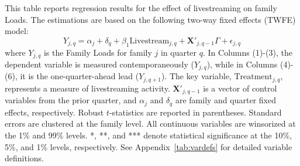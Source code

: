 \begin{table}[!ht]
    \centering
    
    \caption{Dynamic Livestream Effect on Family Loads}\label{tab:family_twfe_loads_reallocation}
    
    \begin{minipage}{0.95\textwidth}
        \footnotesize
        This table reports regression results for the effect of livestreaming on family Loads. The estimations are based on the following two-way fixed effects (TWFE) model:
        \begin{equation*}
            Y_{j,q} = \alpha_j + \delta_q + \beta_1 \text{Livestream}_{j,q} + \mathbf{X}'_{j,q-1} \Gamma + \epsilon_{j,q}
        \end{equation*}
        where $Y_{j,q}$ is the Family Loads for family $j$ in quarter $q$. In Columns (1)-(3), the dependent variable is measured contemporaneously ($Y_{j,q}$), while in Columns (4)-(6), it is the one-quarter-ahead lead ($Y_{j,q+1}$). The key variable, $\text{Treatment}_{j,q}$, represents a measure of livestreaming activity. $\mathbf{X}'_{j,q-1}$ is a vector of control variables from the prior quarter, and $\alpha_j$ and $\delta_q$ are family and quarter fixed effects, respectively. Robust $t$-statistics are reported in parentheses. Standard errors are clustered at the family level. All continuous variables are winsorized at the 1\% and 99\% levels. *, **, and *** denote statistical significance at the 10\%, 5\%, and 1\% levels, respectively. See Appendix~\ref{tab:vardefs} for detailed variable definitions. %
    \end{minipage}

    \vspace{2mm}

     
    
\end{table}